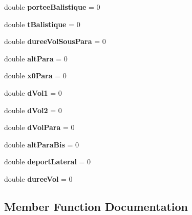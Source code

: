 \begin{DoxyCompactItemize}
double {\bfseries portee\+Balistique} = 0
\item 
\mbox{\label{classpackage_i_h_m_1_1_fusee_a1f2cbd3ecb3647fb11b66ce1a224c739}} 
double {\bfseries t\+Balistique} = 0
\item 
\mbox{\label{classpackage_i_h_m_1_1_fusee_aa79c12329ed3f51afc2b056fe373955b}} 
double {\bfseries duree\+Vol\+Sous\+Para} = 0
\item 
\mbox{\label{classpackage_i_h_m_1_1_fusee_a7b3bdb88b19df235423b3c2c7e6738fa}} 
double {\bfseries alt\+Para} = 0
\item 
\mbox{\label{classpackage_i_h_m_1_1_fusee_a03369ed11391b7eff66c632fecd584c3}} 
double {\bfseries x0\+Para} = 0
\item 
\mbox{\label{classpackage_i_h_m_1_1_fusee_a63c721b6964e106c39354428f210ea48}} 
double {\bfseries d\+Vol1} = 0
\item 
\mbox{\label{classpackage_i_h_m_1_1_fusee_afab74126236cb96f65a25c541931d8f6}} 
double {\bfseries d\+Vol2} = 0
\item 
\mbox{\label{classpackage_i_h_m_1_1_fusee_a74134751bc55407dc8e60b3cd96e5820}} 
double {\bfseries d\+Vol\+Para} = 0
\item 
\mbox{\label{classpackage_i_h_m_1_1_fusee_ab1d6e4ecb2803692169c2fae2e3b9f1a}} 
double {\bfseries alt\+Para\+Bis} = 0
\item 
\mbox{\label{classpackage_i_h_m_1_1_fusee_ae84c5feb8ebcb7ede227986864d24dce}} 
double {\bfseries deport\+Lateral} = 0
\item 
\mbox{\label{classpackage_i_h_m_1_1_fusee_aba7cf90d0513aa9cefcc1d204c7ecbd8}} 
double {\bfseries duree\+Vol} = 0
\end{DoxyCompactItemize}


\subsection{Member Function Documentation}
\mbox{\label{classpackage_i_h_m_1_1_fusee_a041b9744320e9542be57dc3213090695}} 
